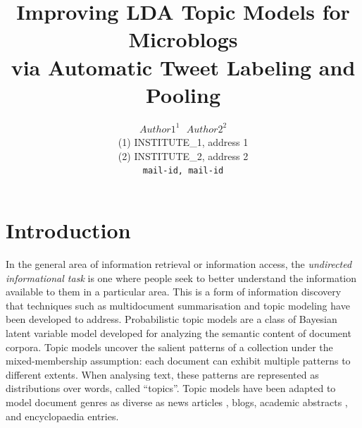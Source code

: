 \documentclass[10pt,a5paper,twoside]{article}
\title{Improving LDA Topic Models for Microblogs\\ via Automatic Tweet Labeling and Pooling}
\author{$Author1^{1}~~~Author2^{2}$\\
{\small  	(1) INSTITUTE\_1, address 1\\ 
 		(2) INSTITUTE\_2, address 2\\
  \texttt{mail-id, mail-id} \\ 
}}
\begin{document}
\maketitle



\section{Introduction}

In the general area of information retrieval or information access,
the {\it undirected informational task} \cite{RoseLev}
 is one where people seek to
better understand the information available to them in a particular area.
This is a form of information discovery that techniques
such as multidocument summarisation \cite{radev02}
and topic modeling have been developed to address.
Probabilistic topic models  \cite{?????}
are a class of Bayesian latent variable
model developed for analyzing the semantic content of
document corpora. Topic models uncover the salient patterns of a
collection under the mixed-membership assumption: each document
can exhibit multiple patterns to different extents. When analysing
text, these patterns are represented as distributions over words, called
“topics”.  Topic models have been adapted to model document
genres as diverse as news articles \cite{baldwin11}, 
blogs, 
academic abstracts \cite{?????}, 
and encyclopaedia entries.
\end{document}
